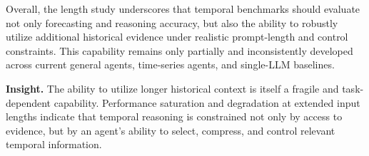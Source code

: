 Overall, the length study underscores that temporal benchmarks should evaluate not only forecasting and reasoning accuracy, but also the ability to robustly utilize additional historical evidence under realistic prompt-length and control constraints.
This capability remains only partially and inconsistently developed across current general agents, time-series agents, and single-LLM baselines.


\begin{insightbox}
\textbf{Insight.}
The ability to utilize longer historical context is itself a fragile and task-dependent capability. Performance saturation and degradation at extended input lengths indicate that temporal reasoning is constrained not only by access to evidence, but by an agent’s ability to select, compress, and control relevant temporal information.
\end{insightbox}


